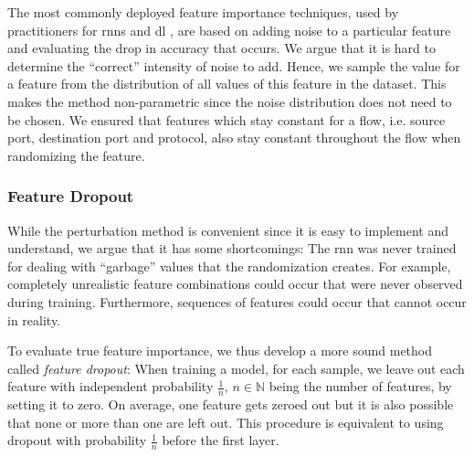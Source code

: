 \documentclass[conference]{IEEEtran}
\begin{document}
The most commonly deployed feature importance techniques, used by practitioners for \glspl{rnn} \cite{stackexchange_cross_validated_neural_2019} and \gls{dl} \cite{molnar_interpretable_2019,stackexchange_cross_validated_feature_2016,olden_accurate_2004}, are based on adding noise to a particular feature and evaluating the drop in accuracy that occurs. We argue that it is hard to determine the ``correct'' intensity of noise to add. %
 Hence, we sample the value for a feature from the distribution of all values of this feature in the dataset. This makes the method non-parametric since the noise distribution  does not need to be chosen. We ensured that features which stay constant for a flow, i.e. source port, destination port and protocol, also stay constant throughout the flow when randomizing the feature.


\subsubsection{Feature Dropout}
While the perturbation method %
is convenient since it is easy to implement and understand, we argue that it has some shortcomings:
The \gls{rnn} was never trained for dealing with ``garbage'' values that the randomization creates. For example, completely unrealistic feature combinations could occur that were never observed during training. Furthermore, sequences of features could occur that cannot occur in reality.


To evaluate true feature importance, we thus develop a more sound method %
called \textit{feature dropout}: When training a model, for each sample, we leave out each feature  with independent probability $\frac{1}{n}$, $n \in \mathbb N$ being the number of features, by setting it to zero. On average, one feature gets zeroed out but it is also possible that none or more than one are left out. This procedure is equivalent to using dropout \cite{srivastava_dropout:_2014} with probability $\frac{1}{n}$ before the first layer.
\end{document}
